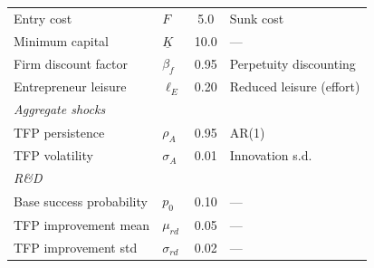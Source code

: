 \documentclass[12pt]{article}
\begin{document}
\begin{table}[tp]
\begin{tabular}{@{}llcl@{}}
Entry cost & $F$ & 5.0 & Sunk cost \\
Minimum capital & $\underline{K}$ & 10.0 & --- \\
Firm discount factor & $\beta_f$ & 0.95 & Perpetuity discounting \\
Entrepreneur leisure & $\ell_E$ & 0.20 & Reduced leisure (effort) \\
\midrule
\multicolumn{4}{l}{\textit{Aggregate shocks}} \\
TFP persistence & $\rho_A$ & 0.95 & AR(1) \\
TFP volatility & $\sigma_A$ & 0.01 & Innovation s.d. \\
\midrule
\multicolumn{4}{l}{\textit{R\&D}} \\
Base success probability & $p_0$ & 0.10 & --- \\
TFP improvement mean & $\mu_{rd}$ & 0.05 & --- \\
TFP improvement std & $\sigma_{rd}$ & 0.02 & --- \\
\bottomrule
\end{tabular}
\end{table}
\end{document}
